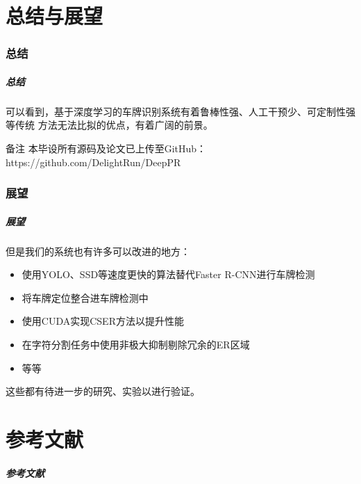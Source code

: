 \documentclass[UTF8]{beamer}
\begin{document}
\part{总结与展望}

\section{总结}

\begin{frame}
  \frametitle{总结}

  可以看到，基于深度学习的车牌识别系统有着鲁棒性强、人工干预少、可定制性强等传统
  方法无法比拟的优点，有着广阔的前景。

  \begin{block}{备注}
    本毕设所有源码及论文已上传至GitHub：https://github.com/DelightRun/DeepPR
  \end{block}
\end{frame}

\section{展望}

\begin{frame}
  \frametitle{展望}

  但是我们的系统也有许多可以改进的地方：
  \begin{itemize}
    \item 使用YOLO\cite{Redmon:2015tl}、SSD\cite{Liu:2015wa}等速度更快的算法替代Faster R-CNN进行车牌检测
    \item 将车牌定位整合进车牌检测中
    \item 使用CUDA实现CSER方法以提升性能
    \item 在字符分割任务中使用非极大抑制剔除冗余的ER区域
    \item 等等
    \end{itemize}
  这些都有待进一步的研究、实验以进行验证。
\end{frame}    

\part{参考文献}

\begin{frame}[t, allowframebreaks]
  \frametitle{参考文献}
  \printbibliography
\end{frame}

{ \xdbg
\begin{frame}
\end{frame}
}
\end{document}
